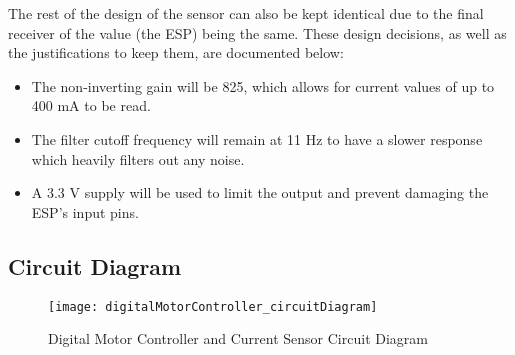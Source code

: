 The rest of the design of the sensor can also be kept identical due to the final receiver of the value (the ESP) being the same. These design decisions, as well as the justifications
to keep them, are documented below:
\begin{itemize}
    \item The non-inverting gain will be 825, which allows for current values of up to 400 mA to be read.
    \item The filter cutoff frequency will remain at 11 Hz to have a slower response which heavily filters out any noise.
    \item A 3.3 V supply will be used to limit the output and prevent damaging the ESP's input pins.
\end{itemize}

\subsection{Circuit Diagram}

\begin{figure}[!htb]
  \centering
  \texttt{[image: digitalMotorController\_circuitDiagram]}
  \caption{Digital Motor Controller and Current Sensor Circuit Diagram}
  \label{fig:digitalMotorController_circuitDiagram}
\end{figure}